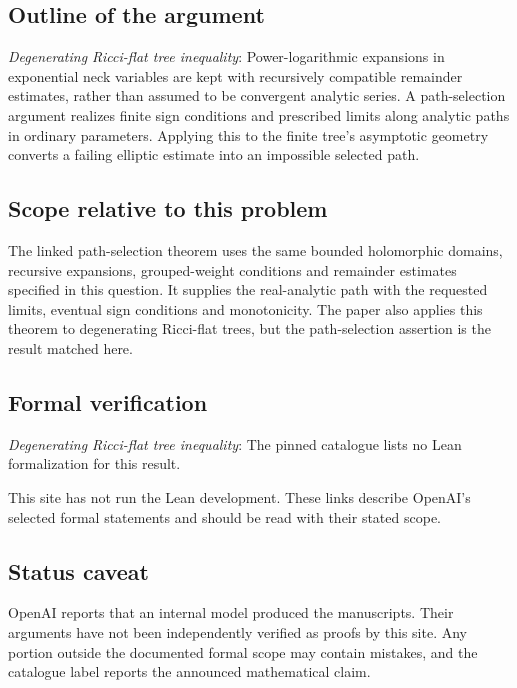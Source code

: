\documentclass[11pt]{article}
\begin{document}
\subsection{Outline of the argument}
\textit{Degenerating Ricci-flat tree inequality}: Power-logarithmic expansions in exponential neck variables are kept with recursively compatible remainder estimates, rather than assumed to be convergent analytic series. A path-selection argument realizes finite sign conditions and prescribed limits along analytic paths in ordinary parameters. Applying this to the finite tree’s asymptotic geometry converts a failing elliptic estimate into an impossible selected path.

\subsection{Scope relative to this problem}
The linked path-selection theorem uses the same bounded holomorphic domains, recursive expansions, grouped-weight conditions and remainder estimates specified in this question. It supplies the real-analytic path with the requested limits, eventual sign conditions and monotonicity. The paper also applies this theorem to degenerating Ricci-flat trees, but the path-selection assertion is the result matched here.

\subsection{Formal verification}
\textit{Degenerating Ricci-flat tree inequality}: The pinned catalogue lists no Lean formalization for this result.

This site has not run the Lean development. These links describe OpenAI’s selected formal statements and should be read with their stated scope.

\subsection{Status caveat}
OpenAI reports that an internal model produced the manuscripts. Their arguments have not been independently verified as proofs by this site. Any portion outside the documented formal scope may contain mistakes, and the catalogue label reports the announced mathematical claim.
\end{document}
